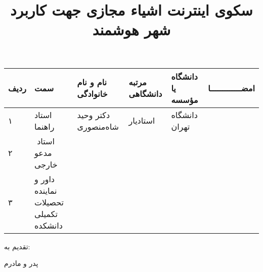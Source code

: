 \subject{مهندسی برق}

\title{سكوی اينترنت اشياء مجازی جهت كاربرد شهر هوشمند}

\blankpage
\firstPage
\blankpage
\besmPage
\blankpage
\firstPage
\blankpage
\davaranPage
\leavevmode\thispagestyle{empty}
\begin{center}
\begin{tabular}{| p{8mm} | p{35mm} | p{} |p{14mm}|p{}|c|}
\hline
ردیف	  & سمت                                   & نام و نام خانوادگی    & مرتبه \newline دانشگاهی &	دانشگاه یا مؤسسه   &	امضـــــــــــــا \\
\hline
۱       & استاد راهنما                          & دکتر وحید شاه‌منصوری   & استاد‌یار                & دانشگاه تهران      &                    \\
\hline
۲       &‌ استاد مدعو خارجی			                 &                       &                         &                    &                    \\
\hline
۳       & داور و نماینده تحصیلات تکمیلی دانشکده	 &                       &                         &                    &                    \\
\hline
\end{tabular}
\end{center}
\esalatPage
\blankpage
\newpage\clearpage


\thispagestyle{empty}
{\Large تقدیم به:}\\
\begin{flushleft}
{\huge
پدر و مادرم
}
\end{flushleft}

